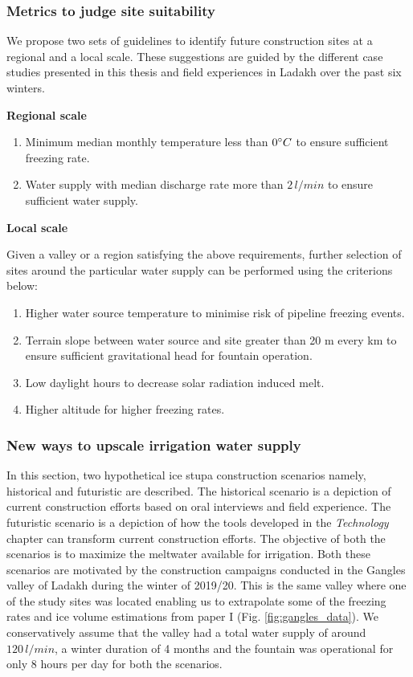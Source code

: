\subsubsection{Metrics to judge site suitability}

We propose two sets of guidelines to identify future construction sites at a regional and a local scale. These
suggestions are guided by the different case studies presented in this thesis and field experiences in
Ladakh over the past six winters.

\textbf{Regional scale}

\begin{enumerate}

	\item Minimum median monthly temperature less than $0 ^{\circ} C$ to ensure sufficient freezing rate.
	\item Water supply with median discharge rate more than $2\, l/min$ to ensure sufficient water supply.

\end{enumerate}

\textbf{Local scale}

Given a valley or a region satisfying the above requirements, further selection of sites around the particular
water supply can be performed using the criterions below:

\begin{enumerate}
	\item Higher water source temperature to minimise risk of pipeline freezing events.
	\item Terrain slope between water source and site greater than 20 m every km to ensure sufficient
    gravitational head for fountain operation.
	\item Low daylight hours to decrease solar radiation induced melt.
	\item Higher altitude for higher freezing rates.
\end{enumerate}

\subsubsection{New ways to upscale irrigation water supply}

In this section, two hypothetical ice stupa construction scenarios namely, historical and
futuristic are described. The historical scenario is a depiction of current construction efforts based on oral interviews and
field experience. The futuristic scenario is a depiction of how the tools developed in the \textit{Technology}
chapter can transform current construction efforts. The objective of both the scenarios is to maximize the
meltwater available for irrigation. Both these scenarios are motivated by the construction campaigns conducted
in the Gangles valley of Ladakh during the winter of 2019/20. This is the same valley where one of the study
sites was located enabling us to extrapolate some of the freezing rates and ice volume estimations from paper I
(Fig. \ref{fig:gangles_data}). We conservatively assume that the valley had a total water supply of around
$120\,l/min$, a winter duration of 4 months and the fountain was operational for only 8 hours per day for both
the scenarios. 


